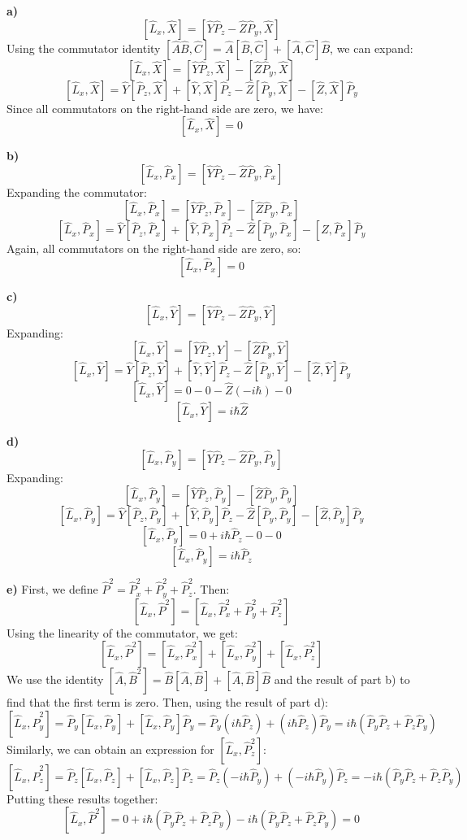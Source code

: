 \documentclass{article}
\begin{document}
\textbf{a)}
\[ [\hat{L}_x, \hat{X}] = [\hat{Y}\hat{P}_z - \hat{Z}\hat{P}_y, \hat{X}] \]
Using the commutator identity $[\hat{A}\hat{B}, \hat{C}] = \hat{A}[\hat{B},\hat{C}] + [\hat{A},\hat{C}]\hat{B}$, we can expand:
\[ [\hat{L}_x, \hat{X}] = [\hat{Y}\hat{P}_z, \hat{X}] - [\hat{Z}\hat{P}_y, \hat{X}] \]
\[ [\hat{L}_x, \hat{X}] = \hat{Y}[\hat{P}_z, \hat{X}] + [\hat{Y}, \hat{X}]\hat{P}_z - \hat{Z}[\hat{P}_y, \hat{X}] - [\hat{Z}, \hat{X}]\hat{P}_y \]
Since all commutators on the right-hand side are zero, we have:
\[ [\hat{L}_x, \hat{X}] = 0 \]

\textbf{b)}
\[ [\hat{L}_x, \hat{P}_x] = [\hat{Y}\hat{P}_z - \hat{Z}\hat{P}_y, \hat{P}_x] \]
Expanding the commutator:
\[ [\hat{L}_x, \hat{P}_x] = [\hat{Y}\hat{P}_z, \hat{P}_x] - [\hat{Z}\hat{P}_y, \hat{P}_x] \]
\[ [\hat{L}_x, \hat{P}_x] = \hat{Y}[\hat{P}_z, \hat{P}_x] + [\hat{Y}, \hat{P}_x]\hat{P}_z - \hat{Z}[\hat{P}_y, \hat{P}_x] - [\hat{Z}, \hat{P}_x]\hat{P}_y \]
Again, all commutators on the right-hand side are zero, so:
\[ [\hat{L}_x, \hat{P}_x] = 0 \]

\textbf{c)}
\[ [\hat{L}_x, \hat{Y}] = [\hat{Y}\hat{P}_z - \hat{Z}\hat{P}_y, \hat{Y}] \]
Expanding:
\[ [\hat{L}_x, \hat{Y}] = [\hat{Y}\hat{P}_z, \hat{Y}] - [\hat{Z}\hat{P}_y, \hat{Y}] \]
\[ [\hat{L}_x, \hat{Y}] = \hat{Y}[\hat{P}_z, \hat{Y}] + [\hat{Y}, \hat{Y}]\hat{P}_z - \hat{Z}[\hat{P}_y, \hat{Y}] - [\hat{Z}, \hat{Y}]\hat{P}_y \]
\[ [\hat{L}_x, \hat{Y}] = 0 - 0 - \hat{Z}(-i\hbar) - 0 \]
\[ [\hat{L}_x, \hat{Y}] = i\hbar \hat{Z} \]

\textbf{d)}
\[ [\hat{L}_x, \hat{P}_y] = [\hat{Y}\hat{P}_z - \hat{Z}\hat{P}_y, \hat{P}_y] \]
Expanding:
\[ [\hat{L}_x, \hat{P}_y] = [\hat{Y}\hat{P}_z, \hat{P}_y] - [\hat{Z}\hat{P}_y, \hat{P}_y] \]
\[ [\hat{L}_x, \hat{P}_y] = \hat{Y}[\hat{P}_z, \hat{P}_y] + [\hat{Y}, \hat{P}_y]\hat{P}_z - \hat{Z}[\hat{P}_y, \hat{P}_y] - [\hat{Z}, \hat{P}_y]\hat{P}_y \]
\[ [\hat{L}_x, \hat{P}_y] = 0 + i\hbar \hat{P}_z - 0 - 0 \]
\[ [\hat{L}_x, \hat{P}_y] = i\hbar \hat{P}_z \]

\textbf{e)}
First, we define $\hat{P}^2 = \hat{P}_x^2 + \hat{P}_y^2 + \hat{P}_z^2$.
Then:
\[ [\hat{L}_x, \hat{P}^2] = [\hat{L}_x, \hat{P}_x^2 + \hat{P}_y^2 + \hat{P}_z^2] \]
Using the linearity of the commutator, we get:
\[ [\hat{L}_x, \hat{P}^2] = [\hat{L}_x, \hat{P}_x^2] + [\hat{L}_x, \hat{P}_y^2] + [\hat{L}_x, \hat{P}_z^2] \]
We use the identity $[\hat{A},\hat{B}^2] = \hat{B}[\hat{A},\hat{B}] + [\hat{A},\hat{B}]\hat{B}$ and the result of part b) to find that the first term is zero. Then, using the result of part d):
\[ [\hat{L}_x, \hat{P}_y^2] = \hat{P}_y[\hat{L}_x,\hat{P}_y] + [\hat{L}_x, \hat{P}_y]\hat{P}_y = \hat{P}_y(i\hbar \hat{P}_z) + (i\hbar \hat{P}_z)\hat{P}_y = i\hbar (\hat{P}_y\hat{P}_z + \hat{P}_z\hat{P}_y) \]
Similarly, we can obtain an expression for $[\hat{L}_x, \hat{P}_z^2]$:
\[ [\hat{L}_x, \hat{P}_z^2] = \hat{P}_z[\hat{L}_x,\hat{P}_z] + [\hat{L}_x, \hat{P}_z]\hat{P}_z = \hat{P}_z(-i\hbar \hat{P}_y) + (-i\hbar \hat{P}_y)\hat{P}_z = -i\hbar (\hat{P}_y\hat{P}_z + \hat{P}_z\hat{P}_y) \]
Putting these results together:
\[ [\hat{L}_x, \hat{P}^2] = 0 + i\hbar (\hat{P}_y\hat{P}_z + \hat{P}_z\hat{P}_y) - i\hbar (\hat{P}_y\hat{P}_z + \hat{P}_z\hat{P}_y) = 0 \]
\end{document}
